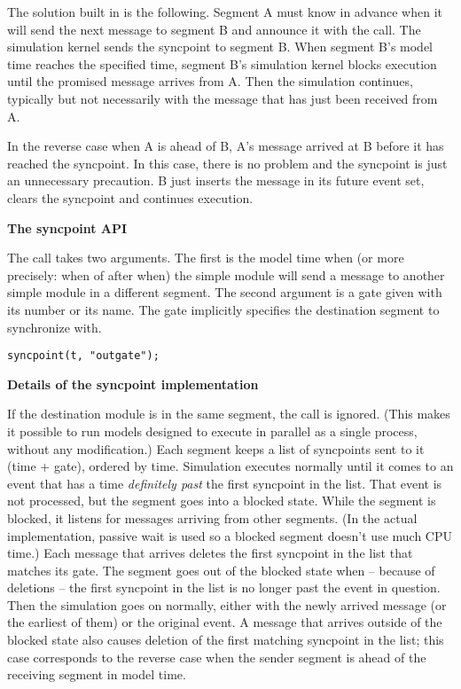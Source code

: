 The solution built in {\opp} is the following. Segment A must know in
advance when it will send the next message to segment B and announce
it with the  call. The simulation kernel sends the
syncpoint to segment B. When segment B's model time reaches the
specified time, segment B's simulation kernel blocks execution until
the promised message arrives from A. Then the simulation continues,
typically but not necessarily with the message that has just been
received from A.

In the reverse case when A is ahead of B, A's message arrived at B
before it has reached the syncpoint. In this case, there is no problem
and the syncpoint is just an unnecessary precaution. B just inserts
the message in its future event set, clears the syncpoint and
continues execution.


\textbf{The syncpoint API}


The  call takes two arguments. The first is the
model time when (or more precisely: when of after when) the simple
module will send a message to another simple module in a different
segment. The second argument is a gate given with its number or its
name. The gate implicitly specifies the destination segment to
synchronize with.

\begin{Verbatim}
syncpoint(t, "outgate");
\end{Verbatim}


\textbf{Details of the syncpoint implementation}


If the destination module is in the same segment, the call is ignored.
(This makes it possible to run models designed to execute in parallel
as a single process, without any modification.) Each segment keeps a
list of syncpoints sent to it (time + gate), ordered by time.
Simulation executes normally until it comes to an event that has a
time \textit{definitely past} the first syncpoint in the list. That
event is not processed, but the segment goes into a blocked state.
While the segment is blocked, it listens for messages arriving from
other segments. (In the actual implementation, passive wait is used so
a blocked segment doesn't use much CPU time.) Each message that
arrives deletes the first syncpoint in the list that matches its gate.
The segment goes out of the blocked state when -- because of deletions
-- the first syncpoint in the list is no longer past the event in
question. Then the simulation goes on normally, either with the newly
arrived message (or the earliest of them) or the original event. A
message that arrives outside of the blocked state also causes deletion
of the first matching syncpoint in the list; this case corresponds to
the reverse case when the sender segment is ahead of the receiving
segment in model time.


